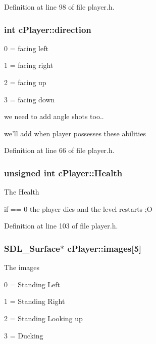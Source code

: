 Definition at line 98 of file player.\-h.

\hypertarget{classc_player_abba8ad20d8e5b5d712b32bb45d6f1f5a}{
\subsubsection[{direction}]{\setlength{\rightskip}{0pt plus 5cm}int c\-Player\-::direction}}\label{classc_player_abba8ad20d8e5b5d712b32bb45d6f1f5a}
0 = facing left\par
 1 = facing right\par
 2 = facing up\par
 3 = facing down\par
 we need to add angle shots too..\par
 we'll add when player possesses these abilities\par
\par
 

Definition at line 66 of file player.\-h.

\hypertarget{classc_player_a54d7325c55feb234dfe3550cf70da559}{
\subsubsection[{Health}]{\setlength{\rightskip}{0pt plus 5cm}unsigned int c\-Player\-::\-Health}}\label{classc_player_a54d7325c55feb234dfe3550cf70da559}
The Health\par
 if == 0 the player dies and the level restarts ;O 

Definition at line 103 of file player.\-h.

\hypertarget{classc_player_a67c4d2933cc64e70d5733f2fae7140d9}{
\subsubsection[{images}]{\setlength{\rightskip}{0pt plus 5cm}S\-D\-L\-\_\-\-Surface$\ast$ c\-Player\-::images\mbox{[}5\mbox{]}}}\label{classc_player_a67c4d2933cc64e70d5733f2fae7140d9}
The images \par
 0 = Standing Left \par
 1 = Standing Right \par
 2 = Standing Looking up \par
 3 = Ducking \par
 

